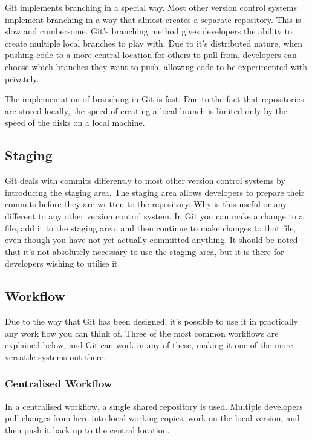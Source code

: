 Git implements branching in a special way.  Most other version control systems implement branching in a way that almost creates a separate repository.  This is slow and cumbersome.  Git's branching method gives developers the ability to create multiple local branches to play with.  Due to it's distributed nature, when pushing code to a more central location for others to pull from, developers can choose which branches they want to push, allowing code to be experimented with privately.

The implementation of branching in Git is fast.  Due to the fact that repositories are stored locally, the speed of creating a local branch is limited only by the speed of the disks on a local machine.

\subsection*{Staging}

Git deals with commits differently to most other version control systems by introducing the staging area.  The staging area allows developers to prepare their commits before they are written to the repository.  Why is this useful or any different to any other version control system.  In Git you can make a change to a file, add it to the staging area, and then continue to make changes to that file, even though you have not yet actually committed anything.
It should be noted that it's not absolutely necessary to use the staging area, but it is there for developers wishing to utilise it.

\subsection*{Workflow}

Due to the way that Git has been designed, it's possible to use it in practically any work flow you can think of.  Three of the most common workflows are explained below, and Git can work in any of these, making it one of the more versatile systems out there.

\subsubsection*{Centralised Workflow}

In a centralised workflow, a single shared repository is used.  Multiple developers pull changes from here into local working copies, work on the local version, and then push it back up to the central location.  

